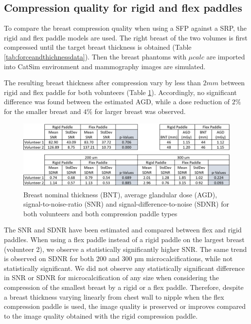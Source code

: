 \subsection{Compression quality for rigid and flex paddles}

To compare the breast compression quality when using a SFP against a SRP, the rigid and flex paddle models are used. The right breast of the two volumes is first compressed until the target breast thickness is obtained (Table \ref{tab:forceandthichnessdata}). Then the breast phantoms with $\mu calc $ are imported into CatSim environment and mammography images are simulated.

The resulting breast thickness after compression vary by less than $2mm$ between rigid and flex paddle for both volunteers (Table \ref{fig:table_compression_results}). Accordingly, no significant difference was found between the estimated AGD, while a dose reduction of $2\%$ for the smaller breast and $4\%$ for larger breast was observed.

\begin{figure}[!h]
\centering
\includegraphics[width=\textwidth,keepaspectratio]{figures/table_compression_results.png} 
\caption{Breast nominal thickness (BNT), average glandular dose (AGD), signal-to-noise-ratio (SNR) and signal-difference-to-noise (SDNR) for both volunteers and both compression paddle types}\label{fig:table_compression_results}
\end{figure}

The SNR and SDNR have been estimated and compared between flex and rigid paddles. When using a flex paddle instead of a rigid paddle on the largest breast (volunteer 2), we observe a statistically significantly higher SNR. The same trend is observed on SDNR for both 200 and 300 µm microcalcifications, while not statistically significant. We did not observe any statistically significant difference in SNR or SDNR for microcalcification of any size when considering the compression of the smallest breast by a rigid or a flex paddle. Therefore, despite a breast thickness varying linearly from chest wall to nipple when the flex compression paddle is used, the image quality is preserved or improves compared to the image quality obtained with the rigid compression paddle.




